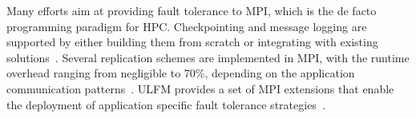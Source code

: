 

Many efforts aim at providing fault tolerance to MPI, which is the de facto programming paradigm for HPC. Checkpointing and message logging are supported by either building them from scratch or integrating with existing solutions~\cite{bosilca2002mpich,7013060,Moody:10:SCR}. Several replication schemes are implemented in MPI, with the runtime overhead ranging from negligible to 70\%, depending on the application communication patterns~\cite{engelmann2011redundant,ferreira_sc_2011,fiala_2012_sdc}. ULFM provides a set of MPI extensions that enable the deployment of application specific fault tolerance strategies~\cite{Bland2012}.
